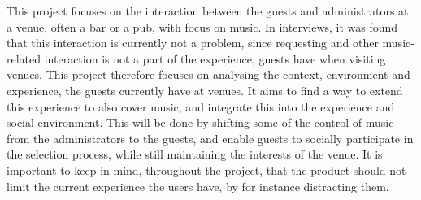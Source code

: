 \begin{center}This project focuses on the interaction between the guests and administrators at a venue, often a bar or a pub, with focus on music.
In interviews, it was found that this interaction is currently not a problem, since requesting and other music-related interaction is not a part of the experience, guests have when visiting venues. This project therefore focuses on analysing the context, environment and experience, the guests currently have at venues. It aims to find a way to extend this experience to also cover music, and integrate this into the experience and social environment. This will be done by shifting some of the control of music from the administrators to the guests, and enable guests to socially participate in the selection process, while still maintaining the interests of the venue. It is important to keep in mind, throughout the project, that the product should not limit the current experience the users have, by for instance distracting them.\\ \end{center}

